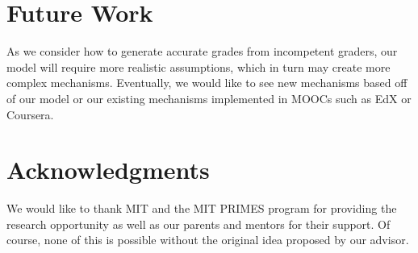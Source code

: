 \documentclass{chi-ext}
\begin{document}
\section{Future Work}
As we consider how to generate accurate grades from incompetent graders, our model will require more realistic assumptions, which in turn may create more complex mechanisms.
Eventually, we would like to see new mechanisms based off of our model or our existing mechanisms implemented in MOOCs such as EdX or Coursera.

\section{Acknowledgments}
We would like to thank MIT and the MIT PRIMES program for providing the research opportunity as well as our parents and mentors for their support. Of course, none of this is possible without the original idea proposed by our advisor.


\balance


\end{document}
